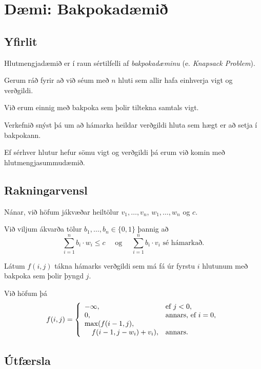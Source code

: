 \section{Dæmi: Bakpokadæmið}
\subsection{Yfirlit}
{
    {
        \item<1-> Hlutmengjadæmið er í raun sértilfelli af \emph{bakpokadæminu} (e. \emph{Knapsack Problem}).
        \item<2-> Gerum ráð fyrir að við séum með $n$ hluti sem allir hafa einhverja vigt og verðgildi.
        \item<3-> Við erum einnig með bakpoka sem þolir tiltekna samtals vigt.
        \item<4-> Verkefnið snýst þá um að hámarka heildar verðgildi hluta sem hægt er að setja í bakpokann.
        \item<5-> Ef sérhver hlutur hefur sömu vigt og verðgildi þá erum við komin með hlutmengjasummudæmið.
    }
}

\subsection{Rakningarvensl}
{
    {
        \item<1-> Nánar, við höfum jákvæðar heiltölur $v_1, \dots, v_n$, $w_1, \dots, w_n$ og $c$.
        \item<2-> Við viljum ákvarða tölur $b_1, \dots, b_n \in \{0, 1\}$ þannig að
        \[
            \sum_{i = 1}^n b_i \cdot w_i \leq c
            \quad \text{ og } \quad
            \sum_{i = 1}^n b_i \cdot v_i \text{ sé hámarkað}.
        \]
        \item<3-> Látum $f(i, j)$ tákna hámarks verðgildi sem má fá úr fyrstu $i$ hlutunum með bakpoka sem þolir þyngd $j$.
        \item<4-> Við höfum þá
        \[
            f(i, j) =
            \left \{
            \env{array}
            {
                {l l}
                -\infty, & \text{ef $j < 0$},\\
                0, & \text{annars, ef $i = 0$},\\
                \max(f(i - 1, j), \\
                        \quad f(i - 1, j - w_i) + v_i), & \text{annars}.
            }
            \right .
        \]
    }
}

\subsection{Útfærsla}
{
}

